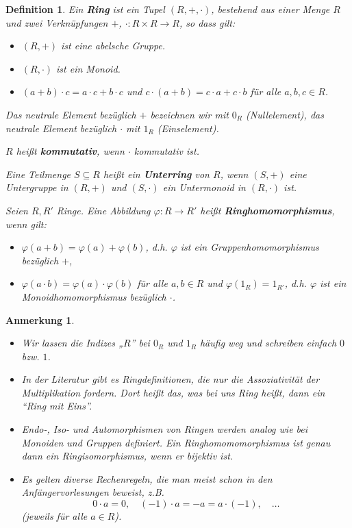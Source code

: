 \documentclass[a4paper, twoside, 11pt, ngerman]{report}
\theoremstyle{definistyle}
\newtheorem{defini}[satz]{Definition}
\newtheorem{anm}[satz]{Anmerkung}
\theoremstyle{remark}
\newcommand{\defn}[1]{\textit{\bfseries #1}}
\begin{document}
\begin{defini}\label{def:ring}
Ein \defn{Ring} ist ein Tupel $(R, {+}, {\cdot})$, bestehend aus einer Menge $R$ und zwei Verknüpfungen $+$, $\cdot \colon R \times R \rightarrow R$, so dass gilt:
\begin{itemize}
    \item[(R1)] $(R, {+})$ ist eine abelsche Gruppe.
    \item[(R2)] $(R, {\cdot})$ ist ein Monoid.
    \item[(R3)] $(a + b) \cdot c = a \cdot c + b \cdot c$ und $c \cdot (a + b) = c \cdot a + c \cdot b$ für alle $a, b, c \in R$.
\end{itemize}
Das neutrale Element bezüglich $+$ bezeichnen wir mit $0_R$ (Nullelement), das neutrale Element bezüglich $\cdot$ mit $1_R$ (Einselement).

$R$ heißt \defn{kommutativ}, wenn $\cdot$ kommutativ ist.

Eine Teilmenge $S \subseteq R$ heißt ein \defn{Unterring} von $R$, wenn $(S, {+})$ eine Untergruppe in $(R, {+})$ und $(S, {\cdot})$ ein Untermonoid in $(R, {\cdot})$ ist.

Seien $R, R'$ Ringe. Eine Abbildung $\varphi \colon R \to R'$ heißt \defn{Ringhomomorphismus}, wenn gilt:
\begin{itemize}
    \item $\varphi(a + b) = \varphi(a) + \varphi(b)$, d.h. $\varphi$ ist ein Gruppenhomomorphismus bezüglich $+$,
    \item $\varphi(a \cdot b) = \varphi(a) \cdot \varphi(b)$ für alle $a, b \in R$ und $\varphi(1_R) = 1_{R'}$, d.h. $\varphi$ ist ein Monoidhomomorphismus bezüglich $\cdot$.
\end{itemize}
\end{defini}


\begin{anm}\label{anm:indizes_bei_nulleins}
\begin{itemize}
\item Wir lassen die Indizes „$R$” bei $0_R$ und $1_R$ häufig weg und schreiben einfach $0$ bzw. $1$.
\item In der Literatur gibt es Ringdefinitionen, die nur die Assoziativität der Multiplikation fordern. Dort heißt das, was bei uns Ring heißt, dann ein "`Ring mit Eins"'.
\item Endo-, Iso- und Automorphismen von Ringen werden analog wie bei Monoiden und Gruppen definiert.
Ein Ringhomomomorphismus ist genau dann ein Ringisomorphismus, wenn er bijektiv ist.
\item Es gelten diverse Rechenregeln, die man meist schon in den Anfängervorlesungen beweist, z.B.
\[
0\cdot a=0, \quad (-1)\cdot a=-a=a\cdot(-1), \quad \ldots  
\]
(jeweils für alle $a\in R$).
\end{itemize}
\end{anm}
\end{document}
